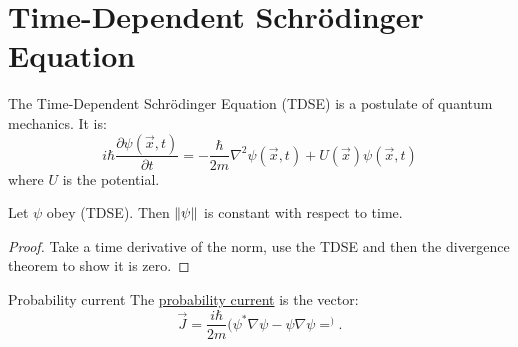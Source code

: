 \documentclass[../Main.tex]{subfiles}
\begin{document}
\section{Time-Dependent Schr\"odinger Equation}
The Time-Dependent Schr\"odinger Equation (TDSE) is a postulate of quantum mechanics. It is:
\begin{equation}
    i\hbar \frac{\partial \psi(\vec{x}, t)}{\partial t} = - \frac{\hbar}{2m} \nabla^2 \psi(\vec{x}, t) + U(\vec{x}) \psi(\vec{x}, t)
    \label{eqnTDSE}
\end{equation}
where $U$ is the potential.
\begin{proposition}
    Let $\psi$ obey  (TDSE). Then $\lVert\psi\rVert$ is constant with respect to time.
    \label{propNormConst}
\end{proposition}
\begin{proof}
    Take a time derivative of the norm, use the TDSE and then the divergence theorem to show it is zero.
\end{proof}
\begin{definition}{Probability current}
    The \underline{probability current} is the vector:
    \begin{equation*}
        \vec{J} = \frac{i\hbar}{2m} (\psi^* \nabla \psi - \psi \nabla \psi=^).
    \end{equation*}
\end{definition}
\end{document}
